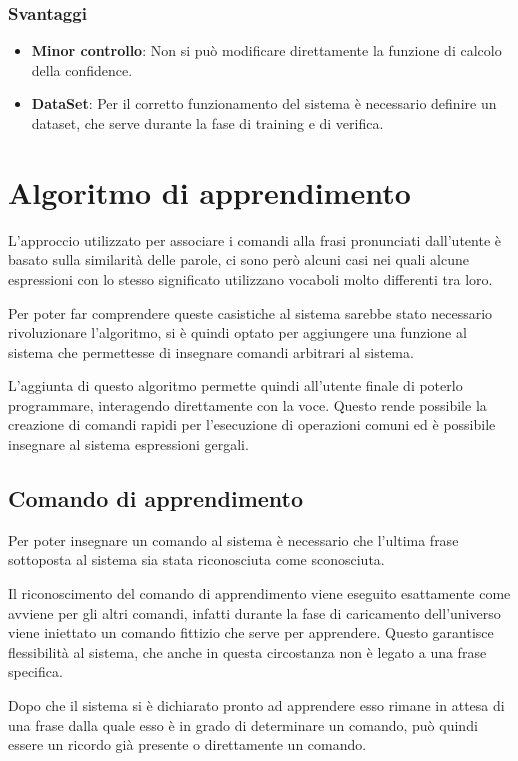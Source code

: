 \documentclass[twoside]{supsistudent}
\begin{document}
\subsection{Svantaggi}
\begin{itemize}
  \item \textbf{Minor controllo}: Non si può modificare direttamente la funzione di calcolo della confidence.
  \item \textbf{DataSet}: Per il corretto funzionamento del sistema è necessario definire un dataset, che serve durante la fase di training e di verifica.
\end{itemize}
\chapter{Algoritmo di apprendimento}
L'approccio utilizzato per associare i comandi alla frasi pronunciati dall'utente è basato sulla similarità delle parole, ci sono però alcuni casi nei quali alcune espressioni con lo stesso significato utilizzano vocaboli molto differenti tra loro.

Per poter far comprendere queste casistiche al sistema sarebbe stato necessario rivoluzionare l'algoritmo, si è quindi optato per aggiungere una funzione al sistema che permettesse di insegnare comandi arbitrari al sistema.

L'aggiunta di questo algoritmo permette quindi all'utente finale di poterlo programmare, interagendo direttamente con la voce. Questo rende possibile la creazione di comandi rapidi per l'esecuzione di operazioni comuni ed è possibile insegnare al sistema espressioni gergali.
\section{Comando di apprendimento}
Per poter insegnare un comando al sistema è necessario che l'ultima frase sottoposta al sistema sia stata riconosciuta come sconosciuta. 

Il riconoscimento del comando di apprendimento viene eseguito esattamente come avviene per gli altri comandi, infatti durante la fase di caricamento dell'universo viene iniettato un comando fittizio che serve per apprendere. Questo garantisce flessibilità al sistema, che anche in questa circostanza non è legato a una frase specifica.

Dopo che il sistema si è dichiarato pronto ad apprendere esso rimane in attesa di una frase dalla quale esso è in grado di determinare un comando, può quindi essere un ricordo già presente o direttamente un comando.
\end{document}
